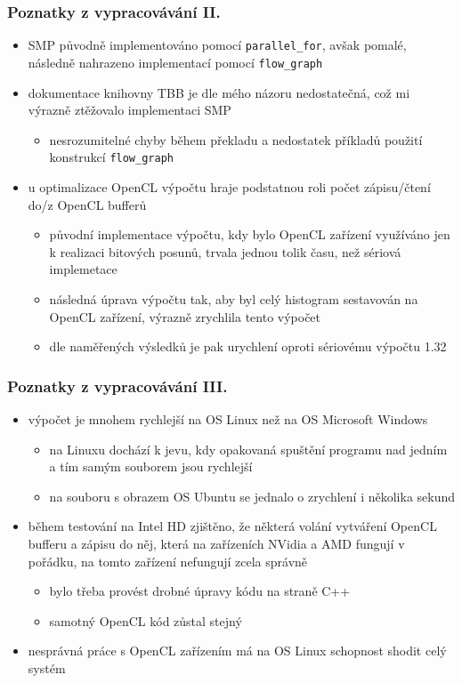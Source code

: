 \documentclass[xcolor=dvipsnames]{beamer}
\begin{document}
\begin{frame} \frametitle{Poznatky z vypracovávání II.}
    \begin{itemize}
        \item SMP původně implementováno pomocí \texttt{parallel\_for}, avšak pomalé, následně nahrazeno implementací pomocí \texttt{flow\_graph}
        \item dokumentace knihovny TBB je dle mého názoru nedostatečná, což mi výrazně ztěžovalo implementaci SMP
        \begin{itemize}
            \item nesrozumitelné chyby během překladu a nedostatek příkladů použití konstrukcí \texttt{flow\_graph}
        \end{itemize}

        \item u optimalizace OpenCL výpočtu hraje podstatnou roli počet zápisu/čtení do/z OpenCL bufferů
        \begin{itemize}
            \item původní implementace výpočtu, kdy bylo OpenCL zařízení využíváno jen k realizaci bitových posunů, trvala jednou tolik času, než sériová implemetace
            \item následná úprava výpočtu tak, aby byl celý histogram sestavován na OpenCL zařízení, výrazně zrychlila tento výpočet
            \item dle naměřených výsledků je pak urychlení oproti sériovému výpočtu 1.32
        \end{itemize}
    \end{itemize}
\end{frame}

\begin{frame}
\frametitle{Poznatky z vypracovávání III.}
    \begin{itemize}
        \item výpočet je mnohem rychlejší na OS Linux než na OS Microsoft Windows
        \begin{itemize}
            \item na Linuxu dochází k jevu, kdy opakovaná spuštění programu nad jedním a tím samým souborem jsou rychlejší
            \item na souboru s obrazem OS Ubuntu se jednalo o zrychlení i několika sekund
        \end{itemize}
        \item během testování na Intel HD zjištěno, že některá volání vytváření OpenCL bufferu a zápisu do něj, která na zařízeních NVidia a AMD fungují v pořádku, na tomto zařízení nefungují zcela správně
        \begin{itemize}
            \item bylo třeba provést drobné úpravy kódu na straně C++
            \item samotný OpenCL kód zůstal stejný
        \end{itemize}
        \item nesprávná práce s OpenCL zařízením má na OS Linux schopnost shodit celý systém
    \end{itemize}
\end{frame}
\end{document}
